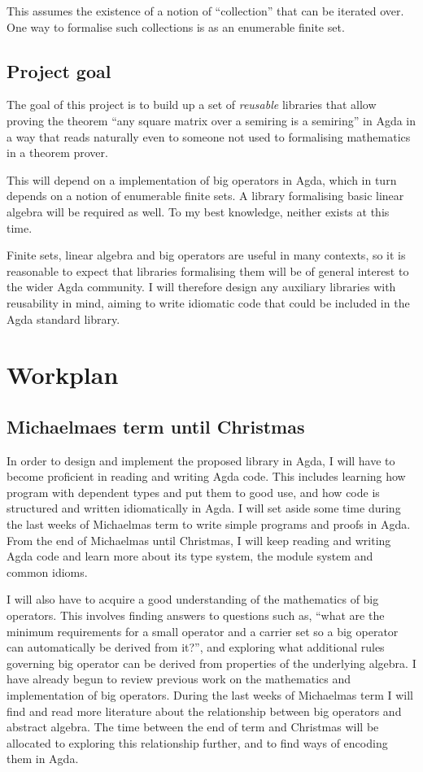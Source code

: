 \documentclass[a4paper]{scrartcl}
\begin{document}
This assumes the existence of a notion of \enquote{collection} that can be iterated over. One way to formalise such collections is as an enumerable finite set.

\subsection{Project goal}

The goal of this project is to build up a set of \emph{reusable} libraries that allow proving the theorem \enquote{any square matrix over a semiring is a semiring} in Agda in a way that reads naturally even to someone not used to formalising mathematics in a theorem prover.

This will depend on a implementation of big operators in Agda, which in turn depends on a notion of enumerable finite sets. A library formalising basic linear algebra will be required as well. To my best knowledge, neither exists at this time.

Finite sets, linear algebra and big operators are useful in many contexts, so it is reasonable to expect that libraries formalising them will be of general interest to the wider Agda community. I will therefore design any auxiliary libraries with reusability in mind, aiming to write idiomatic code that could be included in the Agda standard library.

\section{Workplan}
\label{workplan}

\subsection{Michaelmaes term until Christmas}

In order to design and implement the proposed library in Agda, I will have to become proficient in reading and writing Agda code. This includes learning how program with dependent types and put them to good use, and how code is structured and written idiomatically in Agda. I will set aside some time during the last weeks of Michaelmas term to write simple programs and proofs in Agda. From the end of Michaelmas until Christmas, I will keep reading and writing Agda code and learn more about its type system, the module system and common idioms.

I will also have to acquire a good understanding of the mathematics of big operators. This involves finding answers to questions such as, \enquote{what are the minimum requirements for a small operator and a carrier set so a big operator can automatically be derived from it?}, and exploring what additional rules governing big operator can be derived from properties of the underlying algebra. I have already begun to review previous work on the mathematics and implementation of big operators. During the last weeks of Michaelmas term I will find and read more literature about the relationship between big operators and abstract algebra. The time between the end of term and Christmas will be allocated to exploring this relationship further, and to find ways of encoding them in Agda.
\end{document}
